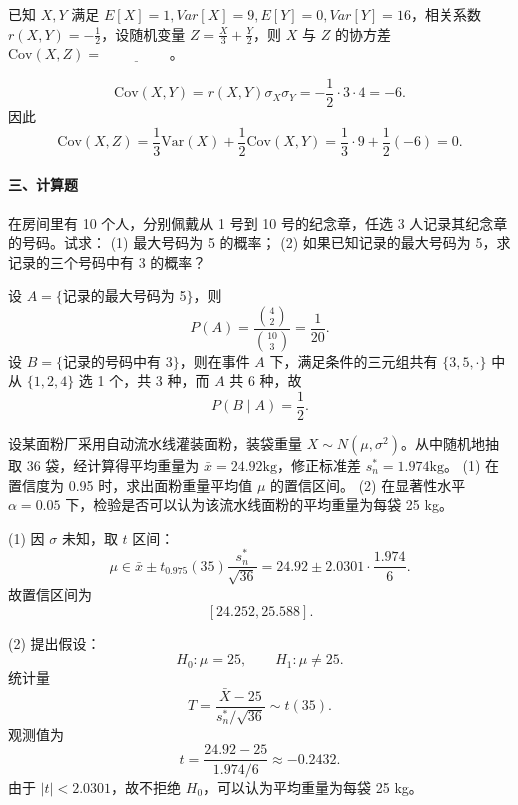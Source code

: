 \documentclass[lang=cn,11pt]{elegantbook}
\begin{document}
\begin{exercise}
\par
已知 \(X,Y\) 满足 \(E[X]=1,Var[X]=9,E[Y]=0,Var[Y]=16\)，相关系数 \(r(X,Y)=-\frac12\)，设随机变量 \(Z=\frac{X}{3}+\frac{Y}{2}\)，则 \(X\) 与 \(Z\) 的协方差 \(\mathrm{Cov}(X,Z)=\underline{\hspace{2cm}}\)。
\end{exercise}

\begin{solution}
\par
\[
\mathrm{Cov}(X,Y)=r(X,Y)\sigma_X\sigma_Y=-\frac12\cdot3\cdot4=-6.
\]
因此
\[
\mathrm{Cov}(X,Z)=\frac13\mathrm{Var}(X)+\frac12\mathrm{Cov}(X,Y)
=\frac13\cdot9+\frac12(-6)=0.
\]
\end{solution}

\paragraph*{三、计算题}
\begin{exercise}
\par
在房间里有 10 个人，分别佩戴从 1 号到 10 号的纪念章，任选 3 人记录其纪念章的号码。试求：
(1) 最大号码为 5 的概率；
(2) 如果已知记录的最大号码为 5，求记录的三个号码中有 3 的概率？
\end{exercise}

\begin{solution}
\par
设 \(A=\{\)记录的最大号码为 5\(\}\)，则
\[
P(A)=\frac{\binom42}{\binom{10}3}=\frac1{20}.
\]
设 \(B=\{\)记录的号码中有 3\(\}\)，则在事件 \(A\) 下，满足条件的三元组共有
\(\{3,5,\cdot\}\) 中从 \(\{1,2,4\}\) 选 1 个，共 3 种，而 \(A\) 共 6 种，故
\[
P(B\mid A)=\frac12.
\]
\end{solution}

\begin{exercise}
\par
设某面粉厂采用自动流水线灌装面粉，装袋重量 \(X\sim N(\mu,\sigma^2)\)。从中随机地抽取 36 袋，经计算得平均重量为 \(\bar{x}=24.92\mathrm{kg}\)，修正标准差 \(s_n^*=1.974\mathrm{kg}\)。
(1) 在置信度为 0.95 时，求出面粉重量平均值 \(\mu\) 的置信区间。
(2) 在显著性水平 \(\alpha=0.05\) 下，检验是否可以认为该流水线面粉的平均重量为每袋 25 kg。
\end{exercise}

\begin{solution}
\par
(1) 因 \(\sigma\) 未知，取 \(t\) 区间：
\[
\mu\in \bar{x}\pm t_{0.975}(35)\frac{s_n^*}{\sqrt{36}}
=24.92\pm2.0301\cdot\frac{1.974}{6}.
\]
故置信区间为
\[
[24.252,25.588].
\]

(2) 提出假设：
\[
H_0:\mu=25,\qquad H_1:\mu\ne25.
\]
统计量
\[
T=\frac{\bar{X}-25}{s_n^*/\sqrt{36}}\sim t(35).
\]
观测值为
\[
t=\frac{24.92-25}{1.974/6}\approx-0.2432.
\]
由于 \(|t|<2.0301\)，故不拒绝 \(H_0\)，可以认为平均重量为每袋 25 kg。
\end{solution}
\end{document}
